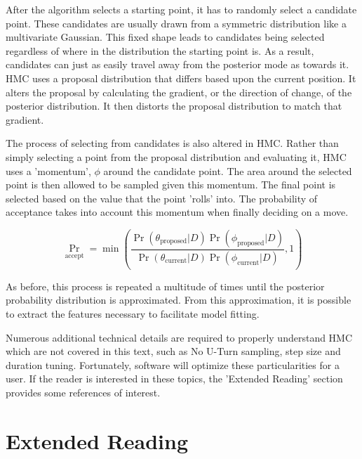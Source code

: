 After the algorithm selects a starting point, it has to randomly select a candidate point. These candidates are usually drawn from a symmetric distribution like a multivariate Gaussian. This fixed shape leads to candidates being selected regardless of where in the distribution the starting point is. As a result, candidates can just as easily travel away from the posterior mode as towards it. HMC uses a proposal distribution that differs based upon the current position. It alters the proposal by calculating the gradient, or the direction of change, of the posterior distribution. It then distorts the proposal distribution to match that gradient.

The process of selecting from candidates is also altered in HMC. Rather than simply selecting a point from the proposal distribution and evaluating it, HMC uses a 'momentum', $\phi$ around the candidate point. The area around the selected point is then allowed to be sampled given this momentum. The final point is selected based on the value that the point 'rolls' into\cite{Kruschke2015}. The probability of acceptance takes into account this momentum when finally deciding on a move.

$$ \Pr_{\text{accept}} = \min\left (\frac{\Pr(\theta_{\text{proposed}}|D)\Pr(\phi_{\text{proposed}}|D)}{\Pr(\theta_{\text{current}}|D)\Pr(\phi_{\text{current}}|D)} , 1 \right )$$

As before, this process is repeated a multitude of times until the posterior probability distribution is approximated. From this approximation, it is possible to extract the features necessary to facilitate model fitting.

Numerous additional technical details are required to properly understand HMC which are not covered in this text, such as No U-Turn sampling, step size and duration tuning. Fortunately, software will optimize these particularities for a user. If the reader is interested in these topics, the 'Extended Reading' section provides some references of interest.






\section*{Extended Reading}

